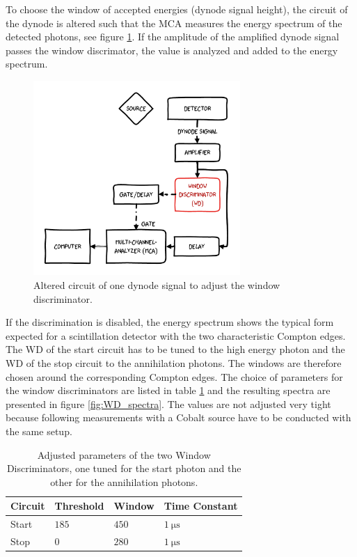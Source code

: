 \documentclass[
	paper=A4,
	parskip=full,
	chapterprefix=true,
	11pt,
	headings=normal,
	bibliography=totoc,
	listof=totoc,
	titlepage=on,
]{scrreprt}
\begin{document}
To choose the window of accepted energies (dynode signal height), the circuit of the dynode is altered such that the MCA measures the energy spectrum of the detected photons, see figure \ref{fig:WD_circuit}. If the amplitude of the amplified dynode signal passes the window discrimator, the value is analyzed and added to the energy spectrum. 
 
\begin{figure}[h]
 	\centering
 	\includegraphics[width=0.7\textwidth]{aufbau_wd}
 	\caption{Altered circuit of one dynode signal to adjust the window discriminator.}
	\label{fig:WD_circuit}
\end{figure}
 
If the discrimination is disabled, the energy spectrum shows the typical form expected for a scintillation detector with the two characteristic Compton edges. The WD of the start circuit has to be tuned to the high energy photon and the WD of the stop circuit to the annihilation photons. The windows are therefore chosen around the corresponding Compton edges. The choice of parameters for the window discriminators are listed in table \ref{tbl:WD_values} and the resulting spectra are presented in figure \ref{fig:WD_spectra}. The values are not adjusted very tight because following measurements with a Cobalt source have to be conducted with the same setup.

\begin{table}[htbp]
	\centering
	\begin{tabular}{ 
			l
			l
			l
			l
		}
		\toprule
		{Circuit} & {Threshold} & {Window} & {Time Constant} \\ 
		\midrule
		Start & $185$ & $450$ & $\SI{1}{\micro\second}$ \\
		Stop & $0$ & $280$ & $\SI{1}{\micro\second}$ \\
		\bottomrule
	\end{tabular}
	\caption{Adjusted parameters of the two Window Discriminators, one tuned for the start photon and the other for the annihilation photons.}
	\label{tbl:WD_values}
\end{table}
\end{document}
